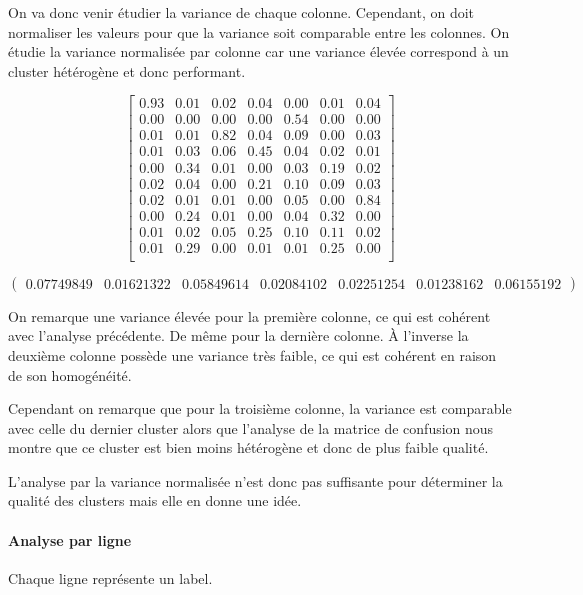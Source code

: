\documentclass[french,a4paper,18pt]{article}
\begin{document}
On va donc venir étudier la variance de chaque colonne. 
Cependant, on doit normaliser les valeurs pour que la variance soit comparable entre les colonnes.
On étudie la variance normalisée par colonne car une variance élevée correspond à un cluster hétérogène et donc performant.

\[
\begin{bmatrix}
    0.93 & 0.01 & 0.02 & 0.04 & 0.00 & 0.01 & 0.04 \\
    0.00 & 0.00 & 0.00 & 0.00 & 0.54 & 0.00 & 0.00 \\
    0.01 & 0.01 & 0.82 & 0.04 & 0.09 & 0.00 & 0.03 \\
    0.01 & 0.03 & 0.06 & 0.45 & 0.04 & 0.02 & 0.01 \\
    0.00 & 0.34 & 0.01 & 0.00 & 0.03 & 0.19 & 0.02 \\
    0.02 & 0.04 & 0.00 & 0.21 & 0.10 & 0.09 & 0.03 \\
    0.02 & 0.01 & 0.01 & 0.00 & 0.05 & 0.00 & 0.84 \\
    0.00 & 0.24 & 0.01 & 0.00 & 0.04 & 0.32 & 0.00 \\
    0.01 & 0.02 & 0.05 & 0.25 & 0.10 & 0.11 & 0.02 \\
    0.01 & 0.29 & 0.00 & 0.01 & 0.01 & 0.25 & 0.00 \\
\end{bmatrix}
\]

\[
\begin{pmatrix}
    0.07749849 & 0.01621322 & 0.05849614 & 0.02084102 & 0.02251254 & 0.01238162 & 0.06155192
\end{pmatrix}
\]

On remarque une variance élevée pour la première colonne, ce qui est cohérent avec l'analyse précédente.
De même pour la dernière colonne.
À l'inverse la deuxième colonne possède une variance très faible, ce qui est cohérent en raison 
de son homogénéité.

Cependant on remarque que pour la troisième colonne, la variance est comparable avec celle du dernier cluster
alors que l'analyse de la matrice de confusion nous montre que ce cluster est bien moins hétérogène et donc de plus faible qualité.

L'analyse par la variance normalisée n'est donc pas suffisante pour déterminer la qualité des clusters mais 
elle en donne une idée.

\paragraph{Analyse par ligne}
Chaque ligne représente un label.
\end{document}
